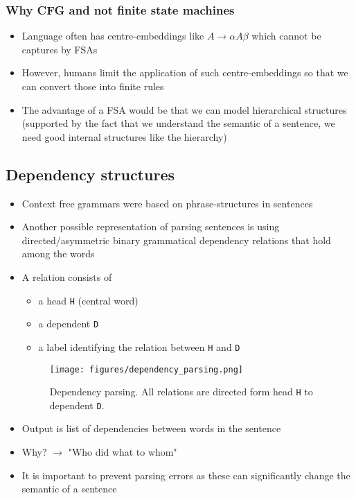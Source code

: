 \subsubsection{Why CFG and not finite state machines}
\begin{itemize}
	\item Language often has centre-embeddings like $A\to \alpha A \beta$ which cannot be captures by FSAs
	\item However, humans limit the application of such centre-embeddings so that we can convert those into finite rules
	\item The advantage of a FSA would be that we can model hierarchical structures (supported by the fact that we understand the semantic of a sentence, we need good internal structures like the hierarchy)
\end{itemize}
\subsection{Dependency structures}
\begin{itemize}
	\item Context free grammars were based on phrase-structures in sentences
	\item Another possible representation of parsing sentences is using directed/asymmetric binary grammatical dependency relations that hold among the words 
	\item A relation consists of 
	\begin{itemize}
		\item a head \texttt{H} (central word)
		\item a dependent \texttt{D}
		\item a label identifying the relation between \texttt{H} and \texttt{D}
	\end{itemize}
	\begin{figure}[ht]
		\centering
		\texttt{[image: figures/dependency\_parsing.png]}
		\caption{Dependency parsing. All relations are directed form head \texttt{H} to dependent \texttt{D}.}
		\label{fig:dependency_parsing}
	\end{figure}
	\item Output is list of dependencies between words in the sentence
	\item Why? $\rightarrow$ "Who did what to whom"
	\item It is important to prevent parsing errors as these can significantly change the semantic of a sentence
\end{itemize}